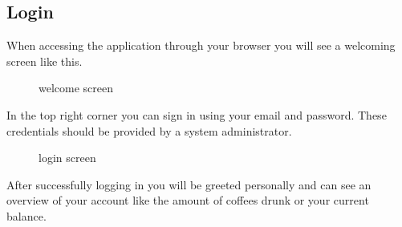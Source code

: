 \subsection{Login}\label{login-1}

When accessing the application through your browser you will see a
welcoming screen like this.

\begin{figure}[htbp]
\centering
{}
\caption{welcome screen}
\end{figure}

In the top right corner you can sign in using your email and password.
These credentials should be provided by a system administrator.

\begin{figure}[htbp]
\centering
{}
\caption{login screen}
\end{figure}

After successfully logging in you will be greeted personally and can see
an overview of your account like the amount of coffees drunk or your
current balance.


